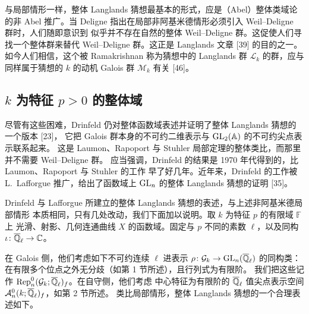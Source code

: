 与局部情形一样，整体 Langlands 猜想最基本的形式，应是（Abel）整体类域论的非 Abel
推广。当 Deligne 指出在局部非阿基米德情形必须引入 Weil--Deligne 群时，人们随即意识到
似乎并不存在自然的整体 Weil--Deligne 群。这促使人们寻找一个整体群来替代
Weil--Deligne 群。这正是 Langlands 文章 [39] 的目的之一。如今人们相信，这个被
Ramakrishnan 称为猜想中的 Langlands 群 $\mathcal{L}_k$ 的群，应与同样属于猜想的
$k$ 的动机 Galois 群 $\mathcal{M}_k$ 有关 [46]。

\subsection{\texorpdfstring{$k$ 为特征 $p>0$ 的整体域}{k 为特征 p>0 的整体域}}

尽管有这些困难，Drinfeld 仍对整体函数域表述并证明了整体 Langlands 猜想的一个版本 [23]，
它把 Galois 群本身的不可约二维表示与 $\mathrm{GL}_2(\mathbb{A})$ 的不可约尖点表示联系起来。
这是 Laumon、Rapoport 与 Stuhler 局部定理的整体类比，而那里并不需要 Weil--Deligne 群。
应当强调，Drinfeld 的结果是 1970 年代得到的，比 Laumon、Rapoport 与 Stuhler 的工作
早了好几年。近年来，Drinfeld 的工作被 L.~Lafforgue 推广，给出了函数域上 $\mathrm{GL}_n$ 的整体
Langlands 猜想的证明 [35]。

Drinfeld 与 Lafforgue 所建立的整体 Langlands 猜想的表述，与上述非阿基米德局部情形
本质相同，只有几处改动，我们下面加以说明。取 $k$ 为特征 $p$ 的有限域 $\mathbb{F}$ 上
光滑、射影、几何连通曲线 $X$ 的函数域。固定与 $p$ 不同的素数 $\ell$，以及同构
$\iota\colon\overline{\mathbb{Q}}_\ell\to\mathbb{C}$。

在 Galois 侧，他们考虑如下不可约连续 $\ell$ 进表示 $\rho\colon\mathcal{G}_k\to
\mathrm{GL}_n(\overline{\mathbb{Q}}_\ell)$ 的同构类：在有限多个位点之外无分歧（如第 1 节所述），且行列式为有限阶。
我们把这些记作 $\operatorname{Rep}_n^0(\mathcal{G}_k;\overline{\mathbb{Q}}_\ell)_f$。在自守侧，他们考虑
中心特征为有限阶的 $\overline{\mathbb{Q}}_\ell$ 值尖点表示空间 $\mathcal{A}_n^0(k;\overline{\mathbb{Q}}_\ell)_f$，如第 2 节所述。
类比局部情形，整体 Langlands 猜想的一个合理表述如下。


